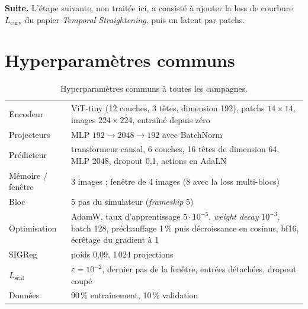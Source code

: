 \documentclass[11pt,a4paper]{article}
\newcommand{\Lscal}{L_{\mathrm{scal}}}
\begin{document}
\textbf{Suite.} L'étape suivante, non traitée ici, a consisté à ajouter la loss de courbure
$L_{\mathrm{curv}}$ du papier \emph{Temporal Straightening}, puis un latent par patchs.

\appendix
\section{Hyperparamètres communs}

\begin{table}[htbp]
\centering\small
\begin{tabular}{@{}lp{12.2cm}@{}}
\toprule
Encodeur & ViT-tiny (12 couches, 3 têtes, dimension 192), patchs $14\times14$, images
$224\times224$, entraîné depuis zéro \\
Projecteurs & MLP $192 \to 2048 \to 192$ avec BatchNorm \\
Prédicteur & transformeur causal, 6 couches, 16 têtes de dimension 64, MLP 2048,
dropout 0,1, actions en AdaLN \\
Mémoire / fenêtre & 3 images ; fenêtre de 4 images (8 avec la loss multi-blocs) \\
Bloc & 5 pas du simulateur (\emph{frameskip} 5) \\
Optimisation & AdamW, taux d'apprentissage $5\cdot10^{-5}$, \emph{weight decay} $10^{-3}$,
batch 128, préchauffage 1\,\% puis décroissance en cosinus, bf16, écrêtage du gradient à 1 \\
SIGReg & poids 0,09, 1\,024 projections \\
$\Lscal$ & $\varepsilon = 10^{-2}$, dernier pas de la fenêtre, entrées détachées, dropout coupé \\
Données & 90\,\% entraînement, 10\,\% validation \\
\bottomrule
\end{tabular}
\caption{Hyperparamètres communs à toutes les campagnes.}
\label{tab:hyper}
\end{table}
\end{document}
